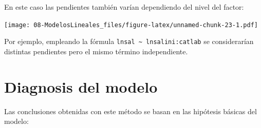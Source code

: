\documentclass[
]{book}
\newenvironment{Shaded}{\begin{snugshade}}{\end{snugshade}}
\newcommand{\AttributeTok}[1]{\textcolor[rgb]{0.77,0.63,0.00}{#1}}
\newcommand{\DecValTok}[1]{\textcolor[rgb]{0.00,0.00,0.81}{#1}}
\newcommand{\FunctionTok}[1]{\textcolor[rgb]{0.00,0.00,0.00}{#1}}
\newcommand{\NormalTok}[1]{#1}
\newcommand{\OtherTok}[1]{\textcolor[rgb]{0.56,0.35,0.01}{#1}}
\newcommand{\SpecialCharTok}[1]{\textcolor[rgb]{0.00,0.00,0.00}{#1}}
\newcommand{\StringTok}[1]{\textcolor[rgb]{0.31,0.60,0.02}{#1}}
\theoremstyle{break}
\begin{document}
En este caso las pendientes también varían dependiendo del nivel del factor:

\begin{Shaded}
\end{Shaded}

\texttt{[image: 08-ModelosLineales\_files/figure-latex/unnamed-chunk-23-1.pdf]}

Por ejemplo, empleando la fórmula \texttt{lnsal\ \textasciitilde{}\ lnsalini:catlab} se considerarían distintas pendientes pero el mismo término independiente.

\hypertarget{diagnosis-del-modelo}{%
\section{Diagnosis del modelo}\label{diagnosis-del-modelo}}

Las conclusiones obtenidas con este método se basan en las hipótesis básicas del modelo:
\end{document}
